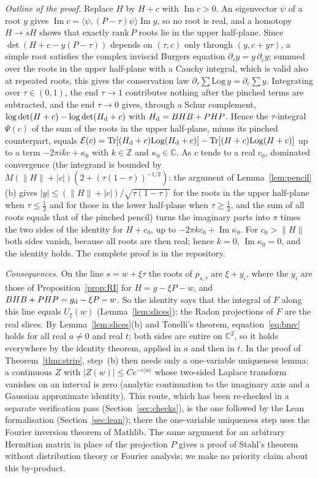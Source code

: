 \documentclass[11pt]{amsart}
\theoremstyle{definition}
\theoremstyle{remark}
\numberwithin{equation}{section}
\newcommand{\C}{\mathbb{C}}
\newcommand{\Z}{\mathbb{Z}}
\newcommand{\Tr}{\operatorname{Tr}}
\renewcommand{\Im}{\operatorname{Im}}
\begin{document}
\emph{Outline of the proof.} Replace $H$ by $H+c$ with $\Im c>0$. An eigenvector $\psi$ of a root $y$ gives
$\Im c=\langle\psi,(P-\tau)\psi\rangle\Im y$, so no root is real, and a homotopy $H\to sH$ shows that exactly
$\mathrm{rank}\,P$ roots lie in the upper half-plane. Since $\det(H+c-y(P-\tau))$ depends on $(\tau,c)$ only through
$(y,c+y\tau)$, a simple root satisfies the complex inviscid Burgers equation $\partial_\tau y=y\,\partial_cy$; summed
over the roots in the upper half-plane with a Cauchy integral, which is valid also at repeated roots, this gives the
conservation law $\partial_\tau\sum\mathrm{Log}\,y=\partial_c\sum y$. Integrating over $\tau\in(0,1)$, the end
$\tau\to1$ contributes nothing after the pinched terms are subtracted, and the end $\tau\to0$ gives, through a Schur
complement, $\log\det(H+c)-\log\det(H_{\rm d}+c)$ with $H_{\rm d}=BHB+PHP$. Hence the $\tau$-integral $\Psi(c)$ of the
sum of the roots in the upper half-plane, minus its pinched counterpart, equals
$\mathcal E(c)=\Tr[(H_{\rm d}+c)\mathrm{Log}(H_{\rm d}+c)]-\Tr[(H+c)\mathrm{Log}(H+c)]$ up to a term $-2\pi ikc+\kappa_0$
with $k\in\Z$ and $\kappa_0\in\C$. As $c$ tends to a real $c_0$, dominated convergence (the integrand is bounded by
$M(\|H\|+|c|)(2+(\tau(1-\tau))^{-1/2})$: the argument of Lemma~\ref{lem:pencil}(b) gives
$|y|\le(\|H\|+|c|)/\sqrt{\tau(1-\tau)}$ for the roots in the upper half-plane when $\tau\le\frac12$ and for those in
the lower half-plane when $\tau\ge\frac12$, and the sum of all roots equals that of the pinched pencil)
turns the imaginary parts into $\pi$ times the two sides of the identity for $H+c_0$, up to $-2\pi kc_0+\Im\kappa_0$.
For $c_0>\|H\|$ both sides vanish, because all roots are then real; hence $k=0$, $\Im\kappa_0=0$, and the identity
holds. The complete proof is in the repository\cite{repoOQP}.

\emph{Consequences.} On the line $s=w+\xi\tau$ the roots of $p_{s,\tau}$ are $\xi+y_i$, where the $y_i$ are those of
Proposition~\ref{prop:RI} for $H=g-\xi P-w$, and $BHB+PHP=g_{\rm d}-\xi P-w$. So the identity says that the integral of
$F$ along this line equals $U_\xi(w)$ (Lemma~\ref{lem:slices}): the Radon projections of $F$ are the real slices. By
Lemma~\ref{lem:slices}(b) and Tonelli's theorem, equation~\eqref{eq:bmv} holds for all real $a\ne0$ and real $t$; both
sides are entire on $\C^2$, so it holds everywhere by the identity theorem, applied in $a$ and then in $t$. In the proof
of Theorem~\ref{thm:strip}, step~(b) then needs only a one-variable uniqueness lemma: a continuous $Z$ with
$|Z(w)|\le Ce^{-c|w|}$ whose two-sided Laplace transform vanishes on an interval is zero (analytic continuation to the
imaginary axis and a Gaussian approximate identity). This route, which has been re-checked in a separate verification
pass (Section~\ref{sec:checks}), is the one followed by the Lean formalisation (Section~\ref{sec:lean}); there the
one-variable uniqueness step uses the Fourier inversion theorem of Mathlib. The same argument for an arbitrary Hermitian
matrix in place of the projection $P$ gives a proof of Stahl's theorem\cite{Stahl} without distribution theory or
Fourier analysis; we make no priority claim about this by-product.
\end{document}
